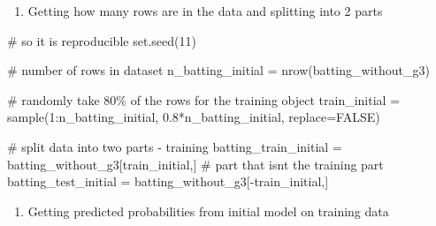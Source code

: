 \documentclass[
  letterpaper,
  DIV=11,
  numbers=noendperiod]{scrartcl}
\newenvironment{Shaded}{\begin{snugshade}}{\end{snugshade}}
\newcommand{\AttributeTok}[1]{\textcolor[rgb]{0.40,0.45,0.13}{#1}}
\newcommand{\CommentTok}[1]{\textcolor[rgb]{0.37,0.37,0.37}{#1}}
\newcommand{\ConstantTok}[1]{\textcolor[rgb]{0.56,0.35,0.01}{#1}}
\newcommand{\DecValTok}[1]{\textcolor[rgb]{0.68,0.00,0.00}{#1}}
\newcommand{\FloatTok}[1]{\textcolor[rgb]{0.68,0.00,0.00}{#1}}
\newcommand{\FunctionTok}[1]{\textcolor[rgb]{0.28,0.35,0.67}{#1}}
\newcommand{\NormalTok}[1]{\textcolor[rgb]{0.00,0.23,0.31}{#1}}
\newcommand{\OtherTok}[1]{\textcolor[rgb]{0.00,0.23,0.31}{#1}}
\newcommand{\SpecialCharTok}[1]{\textcolor[rgb]{0.37,0.37,0.37}{#1}}
\providecommand{\tightlist}{%
  \setlength{\itemsep}{0pt}\setlength{\parskip}{0pt}}\usepackage{longtable,booktabs,array}
\begin{document}
\begin{enumerate}
\def\labelenumi{\arabic{enumi}.}
\tightlist
\item
  Getting how many rows are in the data and splitting into 2 parts
\end{enumerate}

\begin{Shaded}
\begin{Highlighting}[]
\CommentTok{\# so it is reproducible}
\FunctionTok{set.seed}\NormalTok{(}\DecValTok{11}\NormalTok{)}

\CommentTok{\# number of rows in dataset }
\NormalTok{n\_batting\_initial }\OtherTok{=} \FunctionTok{nrow}\NormalTok{(batting\_without\_g3)}

\CommentTok{\# randomly take 80\% of the rows for the training object }
\NormalTok{train\_initial }\OtherTok{=} \FunctionTok{sample}\NormalTok{(}\DecValTok{1}\SpecialCharTok{:}\NormalTok{n\_batting\_initial,}
                   \FloatTok{0.8}\SpecialCharTok{*}\NormalTok{n\_batting\_initial,}
                   \AttributeTok{replace=}\ConstantTok{FALSE}\NormalTok{)}
\end{Highlighting}
\end{Shaded}

\begin{Shaded}
\begin{Highlighting}[]
\CommentTok{\# split data into two parts {-} training }
\NormalTok{batting\_train\_initial }\OtherTok{=}\NormalTok{ batting\_without\_g3[train\_initial,]}
\CommentTok{\# part that isn\textquotesingle{}t the training part}
\NormalTok{batting\_test\_initial }\OtherTok{=}\NormalTok{ batting\_without\_g3[}\SpecialCharTok{{-}}\NormalTok{train\_initial,]}
\end{Highlighting}
\end{Shaded}

\begin{enumerate}
\def\labelenumi{\arabic{enumi}.}
\setcounter{enumi}{1}
\tightlist
\item
  Getting predicted probabilities from initial model on training data
\end{enumerate}
\end{document}
